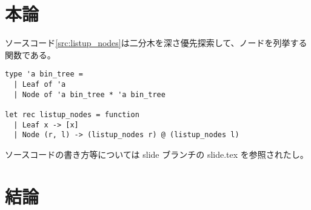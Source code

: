 \documentclass{sumiilab-paper}
\theoremstyle{break}%
\begin{document}
\chapter{本論}

ソースコード\ref{src:listup_nodes}は二分木を深さ優先探索して、ノードを列挙する関数である。
\begin{lstlisting}[caption=二分木のノードのリストアップ,label=src:listup_nodes]
type 'a bin_tree =
  | Leaf of 'a
  | Node of 'a bin_tree * 'a bin_tree

let rec listup_nodes = function
  | Leaf x -> [x]
  | Node (r, l) -> (listup_nodes r) @ (listup_nodes l)
\end{lstlisting}
ソースコードの書き方等については slide ブランチの slide.tex を参照されたし。

\chapter{結論}



\end{document}
